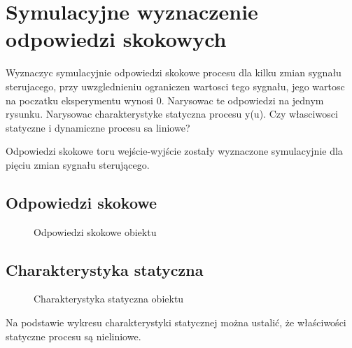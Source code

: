 \section{Symulacyjne wyznaczenie odpowiedzi skokowych}
\label{projekt:zad2}

Wyznaczyc symulacyjnie odpowiedzi skokowe procesu dla kilku zmian sygnału sterujacego,
przy uwzglednieniu ograniczen wartosci tego sygnału, jego wartosc na poczatku
eksperymentu wynosi 0. Narysowac te odpowiedzi na jednym rysunku. Narysowac charakterystyke
statyczna procesu y(u). Czy własciwosci statyczne i dynamiczne procesu
sa liniowe?

Odpowiedzi skokowe toru wejście-wyjście zostały wyznaczone
symulacyjnie dla pięciu zmian sygnału sterującego.

\subsection{Odpowiedzi skokowe}
\label{projekt:zad2:odpSkok}

\begin{figure}[H] 
    \centering
    
    \caption{Odpowiedzi skokowe obiektu}
    \label{projekt:zad2:odpSkok:figure}
\end{figure}

\newpage

\subsection{Charakterystyka statyczna}
\label{projekt:zad2:charStat}

\begin{figure}[H] 
    \centering
    
    \caption{Charakterystyka statyczna obiektu}
    \label{projekt:zad2:charStat:figure}
\end{figure}

Na podstawie wykresu charakterystyki statycznej można ustalić, że właściwości
statyczne procesu są nieliniowe. \newline

\newpage
